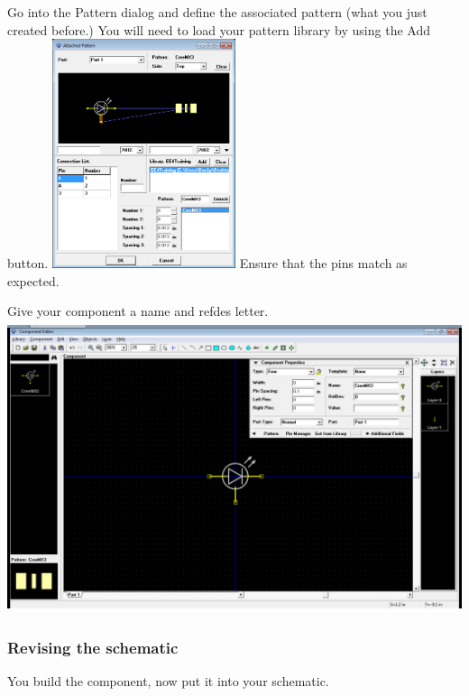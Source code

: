 \documentclass[letterpaper]{article}
\begin{document}
{\sffamily\color[rgb]{0.30980393,0.5058824,0.7411765}
Go into the Pattern dialog and define the associated pattern (what you just created before.) You will need to load your
pattern library by using the {\textquotedbl}Add{\textquotedbl} button.\newline
 \includegraphics[width=2.1165in,height=2.6457in]{figures/ee4document-img046.png} \newline
Ensure that the pins match as expected.}

{\sffamily\color[rgb]{0.30980393,0.5058824,0.7411765}
Give your component a name and refdes letter.\newline
 \includegraphics[width=5.4in,height=3.3665in]{figures/ee4document-img047.png} }

\subsubsection{Revising the schematic}
\hypertarget{Toc337742705}{}{\sffamily\color[rgb]{0.30980393,0.5058824,0.7411765}
You build the component, now put it into your schematic.}
\end{document}
